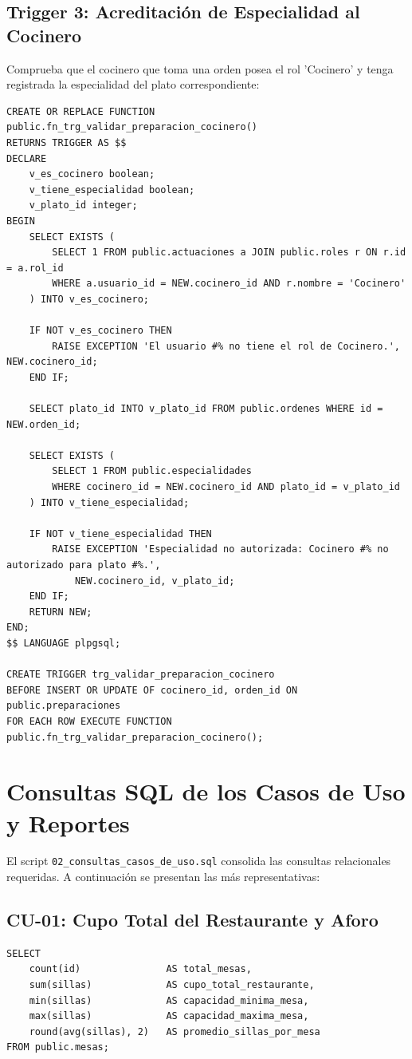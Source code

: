 \documentclass[11pt,letterpaper]{article}
\begin{document}
\subsection{Trigger 3: Acreditación de Especialidad al Cocinero}
Comprueba que el cocinero que toma una orden posea el rol 'Cocinero' y tenga registrada la especialidad del plato correspondiente:
\begin{lstlisting}[style=sqlstyle]
CREATE OR REPLACE FUNCTION public.fn_trg_validar_preparacion_cocinero()
RETURNS TRIGGER AS $$
DECLARE
    v_es_cocinero boolean;
    v_tiene_especialidad boolean;
    v_plato_id integer;
BEGIN
    SELECT EXISTS (
        SELECT 1 FROM public.actuaciones a JOIN public.roles r ON r.id = a.rol_id
        WHERE a.usuario_id = NEW.cocinero_id AND r.nombre = 'Cocinero'
    ) INTO v_es_cocinero;

    IF NOT v_es_cocinero THEN
        RAISE EXCEPTION 'El usuario #% no tiene el rol de Cocinero.', NEW.cocinero_id;
    END IF;

    SELECT plato_id INTO v_plato_id FROM public.ordenes WHERE id = NEW.orden_id;

    SELECT EXISTS (
        SELECT 1 FROM public.especialidades
        WHERE cocinero_id = NEW.cocinero_id AND plato_id = v_plato_id
    ) INTO v_tiene_especialidad;

    IF NOT v_tiene_especialidad THEN
        RAISE EXCEPTION 'Especialidad no autorizada: Cocinero #% no autorizado para plato #%.',
            NEW.cocinero_id, v_plato_id;
    END IF;
    RETURN NEW;
END;
$$ LANGUAGE plpgsql;

CREATE TRIGGER trg_validar_preparacion_cocinero
BEFORE INSERT OR UPDATE OF cocinero_id, orden_id ON public.preparaciones
FOR EACH ROW EXECUTE FUNCTION public.fn_trg_validar_preparacion_cocinero();
\end{lstlisting}

\newpage
\section{Consultas SQL de los Casos de Uso y Reportes}

El script \texttt{02\_consultas\_casos\_de\_uso.sql} consolida las consultas relacionales requeridas. A continuación se presentan las más representativas:

\subsection{CU-01: Cupo Total del Restaurante y Aforo}
\begin{lstlisting}[style=sqlstyle]
SELECT
    count(id)               AS total_mesas,
    sum(sillas)             AS cupo_total_restaurante,
    min(sillas)             AS capacidad_minima_mesa,
    max(sillas)             AS capacidad_maxima_mesa,
    round(avg(sillas), 2)   AS promedio_sillas_por_mesa
FROM public.mesas;
\end{lstlisting}
\end{document}
